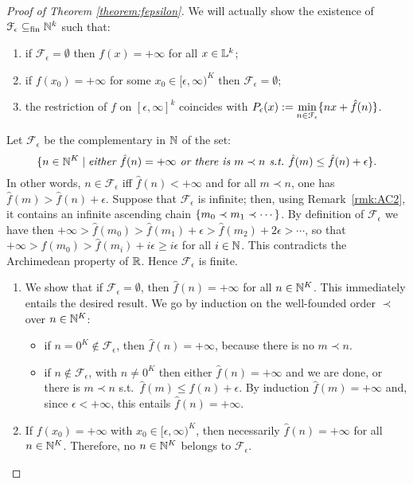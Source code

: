 \begin{proof}[Proof of Theorem \ref{theorem:fepsilon}]
We will actually show the existence of $\mathcal{F}_\epsilon \subseteq_{\mathrm{fin}} \mathbb{N}^k$ such that:
\begin{enumerate}
 \item if $\mathcal{F}_\epsilon= \emptyset$ then $f( x ) = +\infty$ for all $ x \in \mathbb{L}^k$;
 \item if $f( x _0) = +\infty$ for some $ x _0\in [\epsilon,\infty)^{K}$ then $\mathcal{F}_\epsilon= \emptyset$;
 \item the restriction of $f$ on $[\epsilon,\infty]^k$ coincides  with  $P_\epsilon(x):=\min\limits_{n\in \mathcal{F}_\epsilon}\{n x+\hat{f}(n)\}$.
\end{enumerate}
Let $\mathcal F_\epsilon$ be the complementary in $\mathbb{N}$ of the set:
\[
 \{ n  \in\mathbb{N}^{K} \mid \textit{either } \hat f ( n  )=+\infty \textit{ or there is }  m  \prec  n  \textit{ s.t.\ } \hat f( m  )\leq\hat f( n  )+\epsilon\}.
\]
In other words, $ n  \in\mathcal F_\epsilon$ iff $\hat f( n  )<+\infty$ and for all $ m  \prec  n  $, one has $\hat f( m  )>\hat f( n  )+\epsilon$.
Suppose that $\mathcal F_\epsilon$ is infinite; then, using Remark~\ref{rmk:AC2}, it contains an infinite ascending chain $\{ m  _0\prec  m  _1\prec\cdots\}$.  
By definition of $\mathcal F_\epsilon$ we have then 
$+\infty>\hat f( m  _0)>\hat f( m  _1)+\epsilon>\hat f( m  _2)+2\epsilon>\cdots$, 
so that $+\infty>\hat f( m  _0)>\hat f( m  _{i})+i\epsilon\geq i\epsilon$ for all $i\in\mathbb{N}$.
This contradicts the Archimedean property of $\mathbb{R}$. Hence $\mathcal F_{\epsilon}$ is finite.

\begin{enumerate}
\item
We show that if $\mathcal F_\epsilon=\emptyset$, then $\hat f( n  )=+\infty$ for all $ n  \in\mathbb{N}^{K}$.
This immediately entails the desired result.
We go by induction on the well-founded order $\prec$ over $ n  \in\mathbb{N}^{K}$:
\begin{itemize}
\item if $ n  =0^{K}\notin\mathcal F_\epsilon$, then $\hat f( n  )=+\infty$, because there is no $ m  \prec n  $.

\item if $ n  \notin\mathcal F_\epsilon$, with $ n  \neq 0^{K}$ then either $\hat f( n  )=+\infty$ and we are done, or there is $ m  \prec  n  $ s.t.\ $\hat f( m  )\leq \hat f( n  )+\epsilon$.
By induction $\hat f( m  )=+\infty$ and, since $\epsilon<+\infty$, this entails $\hat f( n  )=+\infty$.
\end{itemize}
\item If $f( x _0)=+\infty$ with $ x _0\in [\epsilon,\infty)^{K}$, then necessarily $\hat f( n  )=+\infty$ for all $ n  \in\mathbb{N}^{K}$.
Therefore, no $ n  \in\mathbb{N}^{K}$ belongs to $\mathcal F_\epsilon$.


\end{enumerate}
\end{proof}
